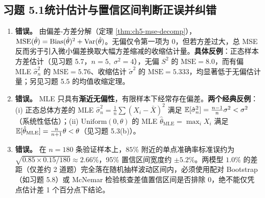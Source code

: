 \subsection*{习题 5.1\quad 统计估计与置信区间判断正误并纠错}
\begin{enumerate}[label=(\alph*), leftmargin=1.8em]
  \item \textbf{错误。} 由偏差-方差分解（定理 \ref{thm:ch5-mse-decomp}），$\mathrm{MSE}(\hat{\theta}) = \operatorname{Bias}(\hat{\theta})^2 + \operatorname{Var}(\hat{\theta})$。无偏仅令第一项为 $0$，但若方差过大，总 MSE 反而劣于引入微小偏差换取大幅方差缩减的收缩估计量。\textbf{具体反例}：正态样本方差估计（见习题 5.7，$n=5,\;\sigma^2=4$），无偏 $S^2$ 的 $\mathrm{MSE}=8.0$，而有偏 MLE $\hat{\sigma}_n^2$ 的 $\mathrm{MSE}=5.76$、收缩估计 $\tilde{\sigma}^2$ 的 $\mathrm{MSE}=5.333$，均显著低于无偏估计量；另见习题 5.5 的均值收缩定理。
  \item \textbf{错误。} MLE 只具有\textbf{渐近无偏性}，有限样本下经常存在偏差。\textbf{两个经典反例}：(i) 正态总体方差的 MLE $\hat{\sigma}_n^2 = \frac{1}{n}\sum (X_i - \bar{X})^2$ 满足 $\mathbb{E}[\hat{\sigma}_n^2] = \frac{n-1}{n}\sigma^2 < \sigma^2$（系统性低估）；(ii) $\mathrm{Uniform}(0, \theta)$ 的 MLE $\hat{\theta}_{\mathrm{MLE}} = \max_i X_i$ 满足 $\mathbb{E}[\hat{\theta}_{\mathrm{MLE}}] = \frac{n}{n+1}\theta < \theta$（见习题 5.3(b)）。
  \item \textbf{错误。} 在 $n = 180$ 条验证样本上，$85\%$ 附近的单点准确率标准误约为 $\sqrt{0.85\times 0.15 / 180} \approx 2.66\%$，95\% 置信区间宽度约 $\pm 5.2\%$。两模型 $1.0\%$ 的差距（仅差约 2 道题）完全落在随机抽样波动区间内，必须使用配对 Bootstrap（如习题 5.8）或 McNemar 检验核查差值置信区间是否排除 $0$，绝不能仅凭点估计差 1 个百分点下结论。
\end{enumerate}

